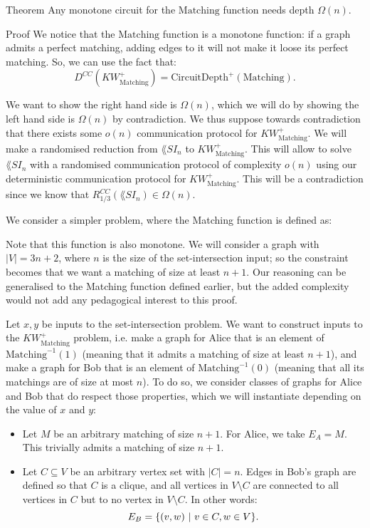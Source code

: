 \documentclass[a4paper]{article}
\begin{document}
\begin{parag}{Theorem}
    Any monotone circuit for the $\text{Matching}$ function needs depth $\Omega\left(n\right)$.

    \begin{subparag}{Proof}
        We notice that the $\text{Matching}$ function is a monotone function: if a graph admits a perfect matching, adding edges to it will not make it loose its perfect matching. So, we can use the fact that: 
        \[D^{CC}\left(KW_{\text{Matching}}^+\right) = \text{CircuitDepth}^+\left(\text{Matching}\right).\]
        
        We want to show the right hand side is $\Omega\left(n\right)$, which we will do by showing the left hand side is $\Omega\left(n\right)$ by contradiction. We thus suppose towards contradiction that there exists some $o\left(n\right)$ communication protocol for $KW_{\text{Matching}}^+$. We will make a randomised reduction from $\lang{SI}_n$ to $KW_{\text{Matching}}^+$. This will allow to solve $\lang{SI}_n$ with a randomised communication protocol of complexity $o\left(n\right)$ using our deterministic communication protocol for $KW_{\text{Matching}}^+$. This will be a contradiction since we know that $R_{1 / 3}^{CC}\left(\lang{SI}_n\right) \in \Omega\left(n\right)$.

        We consider a simpler problem, where the Matching function is defined as: 

        Note that this function is also monotone. We will consider a graph with $\left|V\right| = 3n + 2$, where $n$ is the size of the set-intersection input; so the constraint becomes that we want a matching of size at least $n + 1$. Our reasoning can be generalised to the Matching function defined earlier, but the added complexity would not add any pedagogical interest to this proof.

        Let $x, y$ be inputs to the set-intersection problem. We want to construct inputs to the $KW_{\text{Matching}}^+$ problem, i.e. make a graph for Alice that is an element of $\text{Matching}^{-1}\left(1\right)$ (meaning that it admits a matching of size at least $n+1$), and make a graph for Bob that is an element of $\text{Matching}^{-1}\left(0\right)$ (meaning that all its matchings are of size at most $n$). To do so, we consider classes of graphs for Alice and Bob that do respect those properties, which we will instantiate depending on the value of $x$ and $y$:
        \begin{itemize}
            \item Let $M$ be an arbitrary matching of size $n+ 1$. For Alice, we take $E_A = M$. This trivially admits a matching of size $n+1$.
            \item Let $C \subseteq V$ be an arbitrary vertex set with $\left|C\right| = n$. Edges in Bob's graph are defined so that $C$ is a clique, and all vertices in $V \setminus C$ are connected to all vertices in $C$ but to no vertex in $V \setminus C$. In other words: 
            \[E_B = \left\{\left(v, w\right) \suchthat v \in C, w \in V\right\}.\]
            

\end{itemize}
\end{subparag}
\end{parag}
\end{document}
